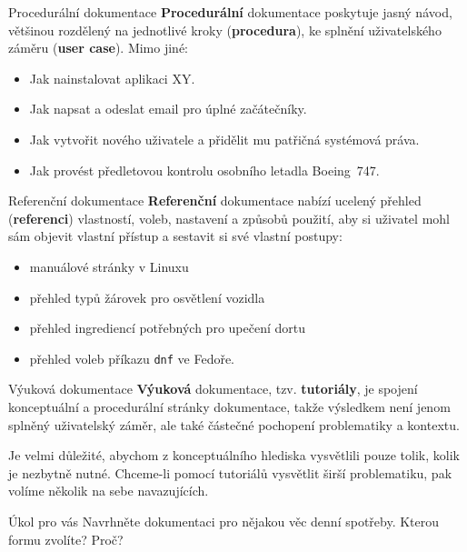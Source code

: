 \documentclass[12pt]{beamer}
\begin{document}
		\begin{frame}{Procedurální dokumentace}
		\textbf{Procedurální} dokumentace poskytuje jasný návod, většinou rozdělený na jednotlivé kroky (\textbf{procedura}), ke splnění uživatelského záměru (\textbf{user case}). Mimo jiné:
	
		\begin{itemize}
			\item Jak nainstalovat aplikaci XY.
			\item Jak napsat a odeslat email pro úplné začátečníky.
			\item Jak vytvořit nového uživatele a přidělit mu patřičná systémová práva.
			\item Jak provést předletovou kontrolu osobního letadla Boeing~747.
		\end{itemize}
		\end{frame}

		\begin{frame}{Referenční dokumentace}
		\textbf{Referenční} dokumentace nabízí ucelený přehled (\textbf{referenci}) vlastností, voleb, nastavení a způsobů použití, aby si uživatel mohl sám objevit vlastní přístup a sestavit si své vlastní postupy:

		\begin{itemize}
			\item manuálové stránky v Linuxu
			\item přehled typů žárovek pro osvětlení vozidla
			\item přehled ingrediencí potřebných pro upečení dortu
			\item přehled voleb příkazu \texttt{dnf} ve Fedoře.
		\end{itemize}
		\end{frame}

  	\begin{frame}{Výuková dokumentace}
		\textbf{Výuková} dokumentace, tzv. \textbf{tutoriály}, je spojení konceptuální a procedurální stránky dokumentace, takže výsledkem není jenom splněný uživatelský záměr, ale také částečné pochopení problematiky a kontextu.
		
		\vspace{5pt}
		
		Je velmi důležité, abychom z konceptuálního hlediska vysvětlili pouze tolik, kolik je nezbytně nutné. Chceme-li pomocí tutoriálů vysvětlit širší problematiku, pak volíme několik na sebe navazujících.	
	\end{frame}

	\begin{frame}{Úkol pro vás}
	Navrhněte dokumentaci pro nějakou věc denní spotřeby. Kterou formu zvolíte? Proč?
	\end{frame}
\end{document}

